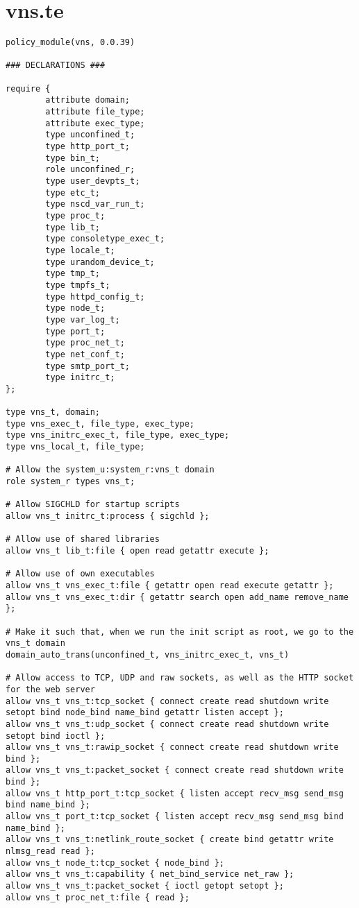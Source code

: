 \documentclass[a4paper,12pt]{report}
\begin{document}
\section{vns.te}
\tiny
\begin{verbatim}
policy_module(vns, 0.0.39)

### DECLARATIONS ###

require {
        attribute domain;
        attribute file_type;
        attribute exec_type;
        type unconfined_t;
        type http_port_t;
        type bin_t;
        role unconfined_r;
        type user_devpts_t;
        type etc_t;
        type nscd_var_run_t;
        type proc_t;
        type lib_t;
        type consoletype_exec_t;
        type locale_t;
        type urandom_device_t;
        type tmp_t;
        type tmpfs_t;
        type httpd_config_t;
        type node_t;
        type var_log_t;
        type port_t;
        type proc_net_t;
        type net_conf_t;
        type smtp_port_t;
        type initrc_t;
};

type vns_t, domain;
type vns_exec_t, file_type, exec_type;
type vns_initrc_exec_t, file_type, exec_type;
type vns_local_t, file_type;

# Allow the system_u:system_r:vns_t domain
role system_r types vns_t;

# Allow SIGCHLD for startup scripts
allow vns_t initrc_t:process { sigchld };

# Allow use of shared libraries
allow vns_t lib_t:file { open read getattr execute };

# Allow use of own executables
allow vns_t vns_exec_t:file { getattr open read execute getattr };
allow vns_t vns_exec_t:dir { getattr search open add_name remove_name };

# Make it such that, when we run the init script as root, we go to the vns_t domain
domain_auto_trans(unconfined_t, vns_initrc_exec_t, vns_t)

# Allow access to TCP, UDP and raw sockets, as well as the HTTP socket for the web server
allow vns_t vns_t:tcp_socket { connect create read shutdown write setopt bind node_bind name_bind getattr listen accept };
allow vns_t vns_t:udp_socket { connect create read shutdown write setopt bind ioctl };
allow vns_t vns_t:rawip_socket { connect create read shutdown write bind };
allow vns_t vns_t:packet_socket { connect create read shutdown write bind };
allow vns_t http_port_t:tcp_socket { listen accept recv_msg send_msg bind name_bind };
allow vns_t port_t:tcp_socket { listen accept recv_msg send_msg bind name_bind };
allow vns_t vns_t:netlink_route_socket { create bind getattr write nlmsg_read read };
allow vns_t node_t:tcp_socket { node_bind };
allow vns_t vns_t:capability { net_bind_service net_raw };
allow vns_t vns_t:packet_socket { ioctl getopt setopt };
allow vns_t proc_net_t:file { read };


\end{verbatim}
\end{document}

